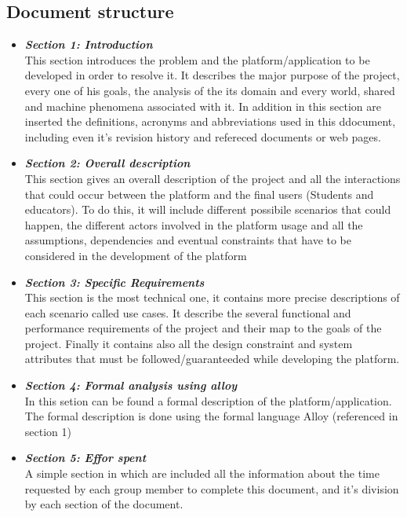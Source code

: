 \documentclass{article}
\begin{document}
{\subsection{Document structure}
    \begin{itemize}
        \item \textbf{\textit{Section 1: Introduction}} \\
        This section introduces the problem and the platform/application to be developed in order to resolve it. It describes the major purpose of the project, every one of his goals, the analysis of the its domain and every world, shared and machine phenomena associated with it.
        In addition in this section are inserted the definitions, acronyms and abbreviations used in this ddocument, including even it's revision history and refereced documents or web pages.
        \item \textbf{\textit{Section 2: Overall description}} \\
        This section gives an overall description of the project and all the interactions that could occur between the platform and the final users (Students and educators). To do this, it will include different possibile scenarios that could happen, the different actors involved in the platform usage and all the assumptions, dependencies and eventual constraints that have to be considered in the development of the platform
        \item \textbf{\textit{Section 3: Specific Requirements}} \\
        This section is the most technical one, it contains more precise descriptions of each scenario called use cases. It describe the several functional and performance requirements of the project and their map to the goals of the project.
        Finally it contains also all the design constraint and system attributes that must be followed/guaranteeded while developing the platform.
        \item \textbf{\textit{Section 4: Formal analysis using alloy}} \\
        In this setion can be found a formal description of the platform/application. The formal description is done using the formal language Alloy (referenced in section 1)
        \item \textbf{\textit{Section 5: Effor spent}} \\
        A simple section in which are included all the information about the time requested by each group member to complete this document, and it's division by each section of the document.
    \end{itemize}

}
\end{document}
